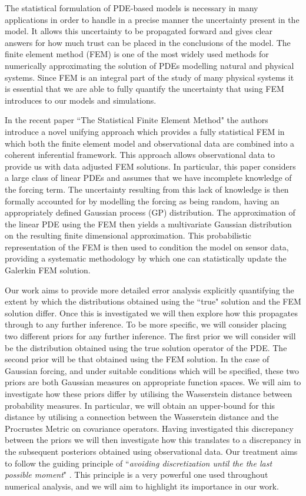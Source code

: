 The statistical formulation of PDE-based models is necessary in many applications in order to handle in a precise manner the uncertainty present in the model. It allows this uncertainty to be propagated forward and gives clear answers for how much trust can be placed in the conclusions of the model. The finite element method (FEM) \textcolor{blue}{\citep{strang1973analysis}} is one of the most widely used methods for numerically approximating the solution of PDEs modelling natural and physical systems. Since FEM is an integral part of the study of many physical systems it is essential that we are able to fully quantify the uncertainty that using FEM introduces to our models and simulations.

In the recent paper ``The Statistical Finite Element Method" \textcolor{blue}{\citep{girolami2019statistical}} the authors introduce a novel unifying approach which provides a fully statistical FEM in which both the finite element model and observational data are combined into a coherent inferential framework. This approach allows observational data to provide us with data adjusted FEM solutions. In particular, this paper considers a large class of linear PDEs and assumes that we have incomplete knowledge of the forcing term. The uncertainty resulting from this lack of knowledge is then formally accounted for by modelling the forcing as being random, having an appropriately defined Gaussian process (GP) distribution. The approximation of the linear PDE using the FEM then yields a multivariate Gaussian distribution on the resulting finite dimensional approximation. This probabilistic representation of the FEM is then used to condition the model on sensor data, providing a systematic methodology by which one can statistically update the Galerkin FEM solution.

Our work aims to provide more detailed error analysis explicitly quantifying the extent by which the distributions obtained using the ``true" solution and the FEM solution differ. Once this is investigated we will then explore how this propagates through to any further inference. To be more specific, we will consider placing two different priors for any further inference. The first prior we will consider will be the distribution obtained using the true solution operator of the PDE. The second prior will be that obtained using the FEM solution. In the case of Gaussian forcing, and under suitable conditions which will be specified, these two priors are both Gaussian measures on appropriate function spaces. We will aim to investigate how these priors differ by utilising the Wasserstein distance between probability measures. In particular, we will obtain an upper-bound for this distance by utilising a connection between the Wasserstein distance and the Procrustes Metric on covariance operators. Having investigated this discrepancy between the priors we will then investigate how this translates to a discrepancy in the subsequent posteriors obtained using observational data. Our treatment aims to follow the guiding principle of ``\textit{avoiding discretization until the the last possible moment}" \textcolor{blue}{\citep{stuart2010inverse}}. This principle is a very powerful one used throughout numerical analysis, and we will aim to highlight its importance in our work.


